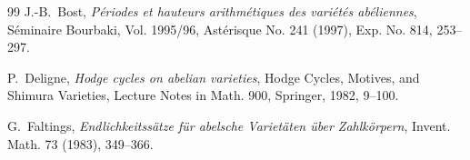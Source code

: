 \documentclass[11pt,a4paper]{article}
\theoremstyle{definition}
\begin{document}
\begin{thebibliography}{99}
J.-B.~Bost,
\emph{P\'eriodes et hauteurs arithm\'etiques des vari\'et\'es ab\'eliennes},
S\'eminaire Bourbaki, Vol. 1995/96, Ast\'erisque No. 241 (1997), Exp. No. 814, 253--297.

P.~Deligne,
\emph{Hodge cycles on abelian varieties},
Hodge Cycles, Motives, and Shimura Varieties, Lecture Notes in Math. 900, Springer, 1982, 9--100.

G.~Faltings,
\emph{Endlichkeitss\"atze f\"ur abelsche Variet\"aten \"uber Zahlk\"orpern},
Invent. Math. 73 (1983), 349--366.
\end{thebibliography}
\end{document}
